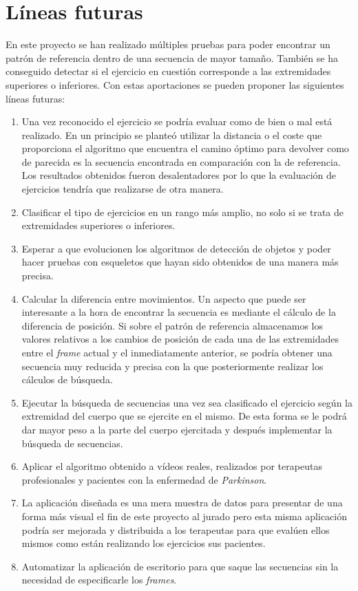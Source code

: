 \section{Líneas futuras} \label{cap:linFutu}
En este proyecto se han realizado múltiples pruebas para poder encontrar un patrón de referencia dentro de una secuencia de mayor tamaño. También se ha conseguido detectar si el ejercicio en cuestión corresponde a las extremidades superiores o inferiores. Con estas aportaciones se pueden proponer las siguientes líneas futuras:
\begin{enumerate}
    \item Una vez reconocido el ejercicio se podría evaluar como de bien o mal está realizado. En un principio se planteó utilizar la distancia o el coste que proporciona el algoritmo que encuentra el camino óptimo para devolver como de parecida es la secuencia encontrada en comparación con la de referencia. Los resultados obtenidos fueron desalentadores por lo que la evaluación de ejercicios tendría que realizarse de otra manera.
    \item Clasificar el tipo de ejercicios en un rango más amplio, no solo si se trata de extremidades superiores o inferiores.
    \item Esperar a que evolucionen los algoritmos de detección de objetos y poder hacer pruebas con esqueletos que hayan sido obtenidos de una manera más precisa.
    \item Calcular la diferencia entre movimientos. Un aspecto que puede ser interesante a la hora de encontrar la secuencia es mediante el cálculo de la diferencia de posición. Si sobre el patrón de referencia almacenamos los valores relativos a los cambios de posición de cada una de las extremidades entre el \textit{frame} actual y el inmediatamente anterior, se podría obtener una secuencia muy reducida y precisa con la que posteriormente realizar los cálculos de búsqueda. 
    \item Ejecutar la búsqueda de secuencias una vez sea clasificado el ejercicio según la extremidad del cuerpo que se ejercite en el mismo. De esta forma se le podrá dar mayor peso a la parte del cuerpo ejercitada y después implementar la búsqueda de secuencias. 
    \item Aplicar el algoritmo obtenido a vídeos reales, realizados por terapeutas profesionales y pacientes con la enfermedad de \textit{Parkinson}.
    \item La aplicación diseñada es una mera muestra de datos para presentar de una forma más visual el fin de este proyecto al jurado pero esta misma aplicación podría ser mejorada y distribuida a los terapeutas para que evalúen ellos mismos como están realizando los ejercicios sus pacientes.
    \item Automatizar la aplicación de escritorio para que saque las secuencias sin la necesidad de especificarle los \textit{frames}.
\end{enumerate}

